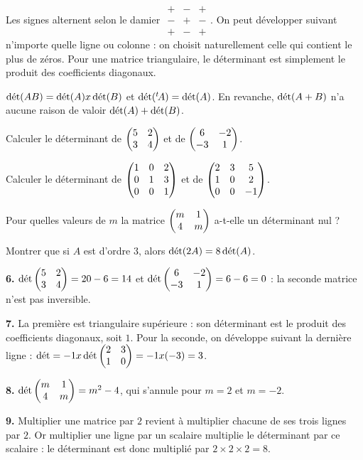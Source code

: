 \begin{remarque}
Les signes alternent selon le damier
$\begin{smallmatrix} + & - & + \\ - & + & - \\ + & - & + \end{smallmatrix}$.
On peut développer suivant n'importe quelle ligne ou colonne : on choisit
naturellement celle qui contient le plus de zéros. Pour une matrice
triangulaire, le déterminant est simplement le produit des coefficients
diagonaux.
\end{remarque}

\begin{propriete}
$\operatorname{d\acute{e}t}(AB) = \operatorname{d\acute{e}t}(A)x\operatorname{d\acute{e}t}(B)$ et
$\operatorname{d\acute{e}t}\!\left({}^{t}\!A\right) = \operatorname{d\acute{e}t}(A)$. En revanche,
$\operatorname{d\acute{e}t}(A+B)$ n'a aucune raison de valoir $\operatorname{d\acute{e}t}(A)+\operatorname{d\acute{e}t}(B)$.
\end{propriete}

\begin{entrainement}[déterminants]
\exo[\niveau{1}] Calculer le déterminant de $\begin{pmatrix} 5 & 2 \\ 3 & 4 \end{pmatrix}$ et de
$\begin{pmatrix} 6 & -2 \\ -3 & 1 \end{pmatrix}$.

\exo[\niveau{2}] Calculer le déterminant de
$\begin{pmatrix} 1 & 0 & 2 \\ 0 & 1 & 3 \\ 0 & 0 & 1 \end{pmatrix}$ et de
$\begin{pmatrix} 2 & 3 & 5 \\ 1 & 0 & 2 \\ 0 & 0 & -1 \end{pmatrix}$.

\exo[\niveau{2}] Pour quelles valeurs de $m$ la matrice
$\begin{pmatrix} m & 1 \\ 4 & m \end{pmatrix}$ a-t-elle un déterminant nul ?

\exo[\niveau{3}] Montrer que si $A$ est d'ordre $3$, alors
$\operatorname{d\acute{e}t}(2A) = 8\operatorname{d\acute{e}t}(A)$.
\end{entrainement}

\begin{corrige}
\textbf{6.} $\operatorname{d\acute{e}t}\begin{pmatrix} 5 & 2 \\ 3 & 4 \end{pmatrix} = 20-6 = 14$ et
$\operatorname{d\acute{e}t}\begin{pmatrix} 6 & -2 \\ -3 & 1 \end{pmatrix} = 6-6 = 0$ : la seconde matrice n'est pas
inversible.

\textbf{7.} La première est triangulaire supérieure : son déterminant est le
produit des coefficients diagonaux, soit $1$. Pour la seconde, on développe
suivant la dernière ligne :
$\operatorname{d\acute{e}t} = -1 x \operatorname{d\acute{e}t}\begin{pmatrix} 2 & 3 \\ 1 & 0 \end{pmatrix} = -1x(-3) = 3$.

\textbf{8.} $\operatorname{d\acute{e}t}\begin{pmatrix} m & 1 \\ 4 & m \end{pmatrix} = m^{2}-4$, qui s'annule pour
$m = 2$ et $m = -2$.

\textbf{9.} Multiplier une matrice par $2$ revient à multiplier chacune de ses
trois lignes par $2$. Or multiplier une ligne par un scalaire multiplie le
déterminant par ce scalaire : le déterminant est donc multiplié par
$2\times2\times2 = 8$.
\end{corrige}

